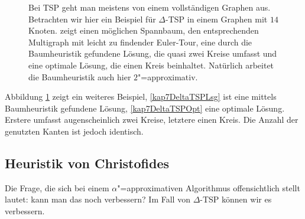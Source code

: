 \begin{figure}[htb]
  \centering
  \hspace{2em}
  \hspace{2em}
  \hspace{2em}
  \caption{Bei TSP geht man meistens von einem vollständigen Graphen aus. Betrachten wir hier ein Beispiel für \textsc{$\varDelta$-TSP} in einem Graphen mit $14$ Knoten.  zeigt einen möglichen Spannbaum,  den entsprechenden Multigraph mit leicht zu findender Euler-Tour,  eine durch die Baumheuristik gefundene Lösung, die quasi zwei Kreise umfasst und  eine optimale Lösung, die einen Kreis beinhaltet. Natürlich arbeitet die Baumheuristik auch hier $2$"=approximativ.}
  \label{kap7DeltaTSP}
\end{figure}

Abbildung \ref{kap7DeltaTSP} zeigt ein weiteres Beispiel, \ref{kap7DeltaTSPLsg} ist eine mittels Baumheuristik gefundene Lösung, \ref{kap7DeltaTSPOpt} eine optimale Lösung. Erstere umfasst augenscheinlich zwei Kreise, letztere einen Kreis. Die Anzahl der genutzten Kanten ist jedoch identisch.






\subsection{Heuristik von Christofides}
Die Frage, die sich bei einem $\alpha$"=approximativen Algorithmus offensichtlich stellt lautet: kann man das noch verbessern? Im Fall von \textsc{$\varDelta$-TSP} können wir es verbessern.

